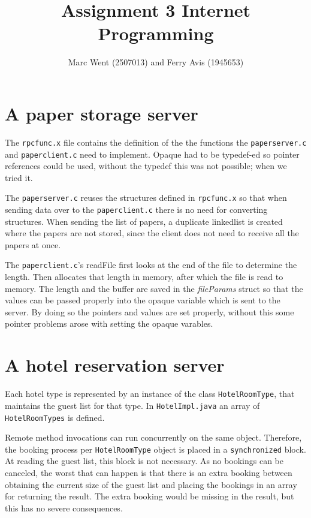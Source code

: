 \documentclass[11pt]{article}
\title{Assignment 3 Internet Programming}
\author{Marc Went (2507013) and Ferry Avis (1945653)}
\begin{document}
\maketitle
\section{A paper storage server}
The \texttt{rpcfunc.x} file contains the definition of the the functions the \texttt{paperserver.c} and \texttt{paperclient.c} need to implement. Opaque had to be typedef-ed so pointer references could be used, without the typedef this was not possible; when we tried it.

The \texttt{paperserver.c} reuses the structures defined in \texttt{rpcfunc.x} so that when sending data over to the \texttt{paperclient.c} there is no need for converting structures. When sending the list of papers, a duplicate linkedlist is created where the papers are not stored, since the client does not need to receive all the papers at once.

The \texttt{paperclient.c}'s readFile first looks at the end of the file to determine the length. Then allocates that length in memory, after which the file is read to memory. The length and the buffer are saved in the \textit{fileParams} struct so that the values can be passed properly into the opaque variable which is sent to the server. By doing so the pointers and values are set properly, without this some pointer problems arose with setting the opaque varables.

\section{A hotel reservation server}

Each hotel type is represented by an instance of the class \texttt{HotelRoomType}, that maintains the guest list for that type. In \texttt{HotelImpl.java} an array of \texttt{HotelRoomTypes} is defined.

Remote method invocations can run concurrently on the same object. Therefore, the booking process per \texttt{HotelRoomType} object is placed in a \texttt{synchronized} block. At reading the guest list, this block is not necessary. As no bookings can be canceled, the worst that can happen is that there is an extra booking between obtaining the current size of the guest list and placing the bookings in an array for returning the result. The extra booking would be missing in the result, but this has no severe consequences.
\end{document}
